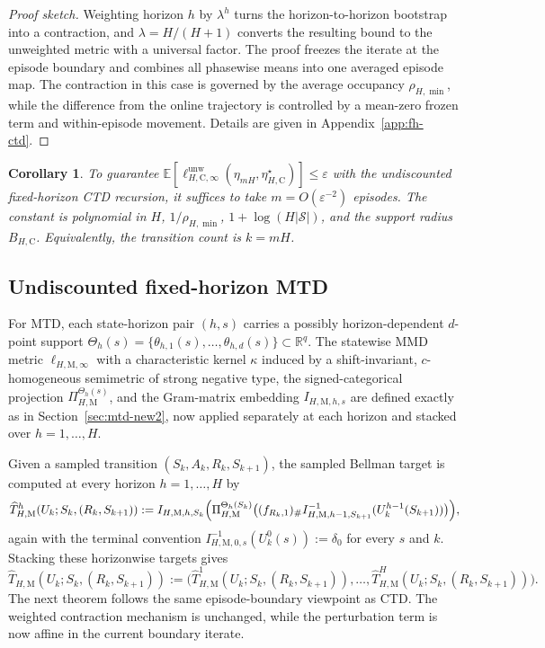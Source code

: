 \documentclass{article}
\newtheorem{corollary}[theorem]{Corollary}
\newcommand{\X}{\mathcal{S}}
\begin{document}
\begin{proof}[Proof sketch]
Weighting horizon $h$ by $\lambda^h$ turns the horizon-to-horizon bootstrap into a contraction, and $\lambda=H/(H+1)$ converts the resulting bound to the unweighted metric with a universal factor. The proof freezes the iterate at the episode boundary and combines all phasewise means into one averaged episode map. The contraction in this case is governed by the average occupancy $\rho_{H,\min}$, while the difference from the online trajectory is controlled by a mean-zero frozen term and within-episode movement. Details are given in Appendix~\ref{app:fh-ctd}.
\end{proof}

\begin{corollary}\label{cor:undisc-ctd}
To guarantee $\mathbb{E}[\ell_{H, \mathrm C,\infty}^{\mathrm{unw}}(\eta_{mH},\eta_{H, \mathrm C}^\star)] \le \varepsilon$ with the undiscounted fixed-horizon CTD recursion, it suffices to take $m = O(\varepsilon^{-2})$ episodes. The constant is polynomial in $H$, $1/\rho_{H,\min}$, $1+\log(H\lvert\X\rvert)$, and the support radius $B_{H,\mathrm C}$. Equivalently, the transition count is $k=mH$.
\end{corollary}

\subsection{Undiscounted fixed-horizon MTD}
For MTD, each state-horizon pair $(h,s)$ carries a possibly horizon-dependent $d$-point support $\Theta_h(s)=\{\theta_{h,1}(s),\dots,\theta_{h,d}(s)\}\subset\mathbb R^q$. The statewise MMD metric $\ell_{H, \mathrm M, \infty}$ with a characteristic kernel $\kappa$ induced by a shift-invariant, $c$-homogeneous semimetric of strong negative type, the signed-categorical projection $\Pi^{\Theta_h(s)}_{H, \mathrm M}$, and the Gram-matrix embedding $I_{H, \mathrm M, h, s}$ are defined exactly as in Section~\ref{sec:mtd-new2}, now applied separately at each horizon and stacked over $h=1,\dots,H$.

Given a sampled transition $(S_k,A_k,R_k,S_{k+1})$, the sampled Bellman target is computed at every horizon $h=1,\dots,H$ by
\begin{equation}
\widehat T_{H,\mathrm M}^h(U_k;S_k,(R_k,S_{k+1})) := I_{H,\mathrm M,h,S_k} \Bigl(\Pi_{H,\mathrm M}^{\Theta_h(S_k)}\bigl((f_{R_k,1})_\# I_{H,\mathrm M,h-1,S_{k+1}}^{-1}(U_k^{h-1}(S_{k+1}))\bigr)\Bigr),
\end{equation}
again with the terminal convention $I_{H,\mathrm M,0,s}^{-1}(U_k^0(s)):=\delta_0$ for every $s$ and $k$. Stacking these horizonwise targets gives
\begin{equation}
\widehat T_{H,\mathrm M}(U_k;S_k,(R_k,S_{k+1})) := \bigl(\widehat T_{H,\mathrm M}^1(U_k;S_k,(R_k,S_{k+1})),\dots,\widehat T_{H,\mathrm M}^H(U_k;S_k,(R_k,S_{k+1}))\bigr).
\end{equation}
The next theorem follows the  same episode-boundary viewpoint as CTD. The weighted contraction mechanism is unchanged, while the perturbation term is now affine in the current boundary iterate.
\end{document}
